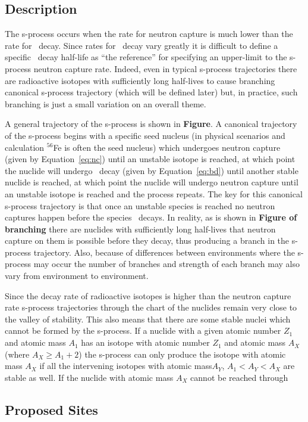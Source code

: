 \label{sec:s}
\subsection{Description}
The s-process occurs when
the rate for neutron capture is much lower than the rate
for \bminus\ decay.  Since rates for \bminus\ decay vary greatly
it is difficult to define a specific \bminus\ decay half-life as ``the
reference'' for specifying an upper-limit to the s-process neutron
capture rate.  Indeed, even in typical
s-process trajectories there are radioactive isotopes with
sufficiently long half-lives to cause branching canonical s-process
trajectory (which will be defined later) but, in practice, such
branching is just a small variation on an overall theme.  

A general trajectory of the s-process is shown in {\bf Figure}.  A
canonical trajectory of the s-process begins with a specific seed
nucleus (in physical scenarios and calculation $^{56}$Fe is often the
seed nucleus) which undergoes neutron capture (given by
Equation~\ref{eq:nc}) until an unstable isotope is reached, at which
point the nuclide will undergo \bminus\ decay (given by
Equation~\ref{eq:bd}) until another stable nuclide is reached, at
which point the nuclide will undergo neutron capture until an unstable
isotope is reached and the process repeats.  The key for this
canonical s-process trajectory is that once an unstable species is
reached no neutron captures happen before the species \bminus\
decays.  In reality, as is shown in {\bf Figure of branching} there
are nuclides with sufficiently long half-lives that neutron capture on
them is possible before they decay, thus producing a branch in the
s-process trajectory.  Also, because of differences between
environments where the s-process may occur the number of branches and
strength of each branch may also vary from environment to environment.

Since the decay rate of radioactive isotopes is higher than the
neutron capture rate s-process trajectories through the chart of the
nuclides remain very close to the valley of stability.  This also
means that there are some stable nuclei which cannot be formed by the
s-process.  If a nuclide with a given atomic number $Z_1$ and atomic
mass $A_1$ has an isotope with atomic number $Z_1$ and atomic mass
$A_X$ (where $A_X \geq A_1 +2$) the s-process can only produce the
isotope with atomic mass $A_X$ if all the intervening isotopes with
atomic mass$A_Y$, $A_1 < A_Y < A_X$ are stable as well.  If the
nuclide with atomic mass $A_X$ cannot be reached through 


\subsection{Proposed Sites}
